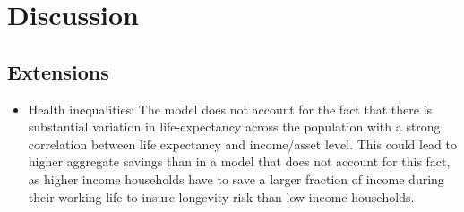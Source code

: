 \pagebreak
\section{Discussion}\label{sec:disc}
\subsection{Extensions}
\begin{itemize}
	\item Health inequalities: The model does not account for the fact that there is substantial variation in life-expectancy across the population with a strong correlation between life expectancy and income/asset level. This could lead to higher aggregate savings than in a model that does not account for this fact, as higher income households have to save a larger fraction of income during their working life to insure longevity risk than low income households. 
\end{itemize}
